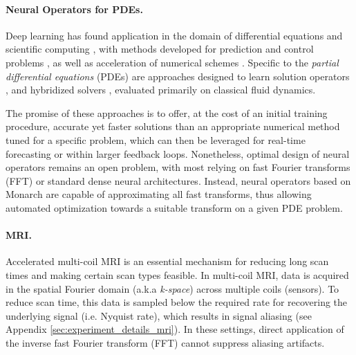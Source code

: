 \paragraph{Neural Operators for PDEs.}

Deep learning has found application in the domain of differential equations and scientific computing \cite{rackauckas2020universal}, with methods developed for prediction and control problems \cite{kidger2020neural,massaroli2021differentiable}, as well as acceleration of numerical schemes \cite{poli2020hypersolvers,jolicoeur2021gotta}. Specific to the \textit{partial differential equations} (PDEs) are approaches designed to learn solution operators \cite{raissi2019physics,fan2020solving,li2020fourier}, and hybridized solvers \cite{kochkov2021machine}, evaluated primarily on classical fluid dynamics.

The promise of these approaches is to offer, at the cost of an initial training procedure, accurate yet faster solutions than an appropriate numerical method tuned for a specific problem, which can then be leveraged for real-time forecasting or within larger feedback loops. Nonetheless, optimal design of neural operators remains an open problem, with most relying on fast Fourier transforms (FFT) or standard dense neural architectures. Instead, neural operators based on Monarch are capable of approximating all fast transforms, thus allowing automated optimization towards a suitable transform on a given PDE problem.

\paragraph{MRI.} Accelerated multi-coil MRI is an essential mechanism for reducing long scan times and making certain scan types feasible. In multi-coil MRI, data is acquired in the spatial Fourier domain (a.k.a \textit{k-space}) across multiple coils (sensors). To reduce scan time, this data is sampled below the required rate for recovering the underlying signal (i.e. Nyquist rate), which results in signal aliasing (see Appendix \ref{sec:experiment_details_mri}). In these settings, direct application of the inverse fast Fourier transform (FFT) cannot suppress aliasing artifacts.

